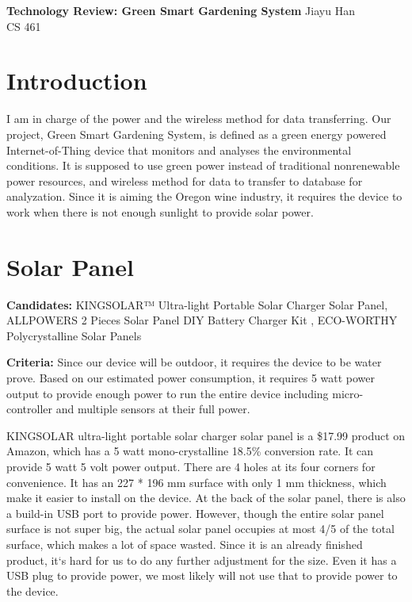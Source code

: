\documentclass[IEEEtran,letterpaper,10pt,titlepage,fleqn,draftclsnofoot,onecolumn]{article}
\begin{document}
\begin{titlepage}
	\begin{center}
		\huge
		\textbf{Technology Review: Green Smart Gardening System}
		\vfill
	\large
	Jiayu Han\\
	CS 461\\
	\end{center}

\end{titlepage}


\section{Introduction}
	
I am in charge of the power and the wireless method for data transferring. Our project, Green Smart Gardening System, is defined as a green energy powered Internet-of-Thing device that monitors and analyses the environmental conditions. It is supposed to use green power instead of traditional nonrenewable power resources, and wireless method for data to transfer to database for analyzation. Since it is aiming the Oregon wine industry, it requires the device to work when there is not enough sunlight to provide solar power.


\section{Solar Panel}

\textbf{Candidates:} KINGSOLAR™ Ultra-light Portable Solar Charger Solar Panel, ALLPOWERS 2 Pieces Solar Panel DIY Battery Charger Kit , ECO-WORTHY Polycrystalline Solar Panels 

\textbf{Criteria:} Since our device will be outdoor, it requires the device to be water prove. Based on our estimated power consumption, it requires 5 watt power output to provide enough power to run the entire device including micro-controller and multiple sensors at their full power.


KINGSOLAR ultra-light portable solar charger solar panel\cite{kingsolar} is a \$17.99 product on Amazon, which has a 5 watt mono-crystalline 18.5\% conversion rate. It can provide 5 watt 5 volt power output. There are 4 holes at its four corners for convenience. It has an 227 * 196 mm surface with only 1 mm thickness, which make it easier to install on the device. At the back of the solar panel, there is also a build-in USB port to provide power. However, though the entire solar panel surface is not super big, the actual solar panel occupies at most 4/5 of the total surface, which makes a lot of space wasted. Since it is an already finished product, it`s hard for us to do any further adjustment for the size. Even it has a USB plug to provide power, we most likely will not use that to provide power to the device.
\end{document}
